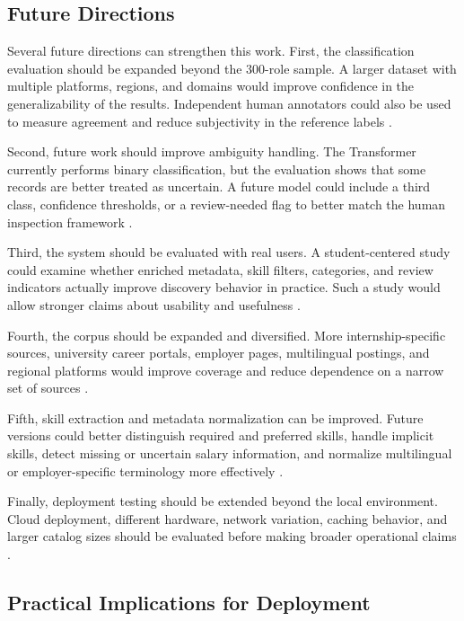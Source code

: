 \subsection{Future Directions}

Several future directions can strengthen this work. First, the classification evaluation should
be expanded beyond the 300-role sample. A larger dataset with multiple platforms, regions,
and domains would improve confidence in the generalizability of the results. Independent
human annotators could also be used to measure agreement and reduce subjectivity in the
reference labels \cite{wohlin2012experimentation, krippendorff2004content}.

Second, future work should improve ambiguity handling. The Transformer currently
performs binary classification, but the evaluation shows that some records are better treated
as uncertain. A future model could include a third class, confidence thresholds, or a
review-needed flag to better match the human inspection framework \cite{sokolova2009systematic, krippendorff2004content}.

Third, the system should be evaluated with real users. A student-centered study could
examine whether enriched metadata, skill filters, categories, and review indicators actually
improve discovery behavior in practice. Such a study would allow stronger claims about
usability and usefulness \cite{wohlin2012experimentation}.

Fourth, the corpus should be expanded and diversified. More internship-specific sources,
university career portals, employer pages, multilingual postings, and regional platforms
would improve coverage and reduce dependence on a narrow set of sources \cite{batini2009methodologies}.

Fifth, skill extraction and metadata normalization can be improved. Future versions could
better distinguish required and preferred skills, handle implicit skills, detect missing or
uncertain salary information, and normalize multilingual or employer-specific terminology
more effectively \cite{staab2009handbook, shvaiko2013ontology}.

Finally, deployment testing should be extended beyond the local environment. Cloud
deployment, different hardware, network variation, caching behavior, and larger catalog sizes
should be evaluated before making broader operational claims \cite{jain1991art, bass2012software}.

\subsection{Practical Implications for Deployment}

